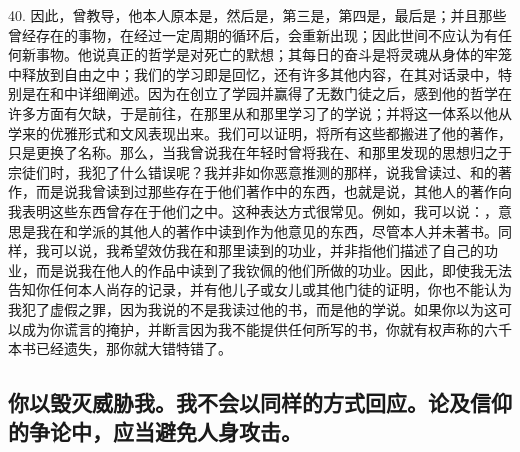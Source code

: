 \par

40. 因此，曾教导，他本人原本是，然后是，第三是，第四是，最后是；并且那些曾经存在的事物，在经过一定周期的循环后，会重新出现；因此世间不应认为有任何新事物。他说真正的哲学是对死亡的默想；其每日的奋斗是将灵魂从身体的牢笼中释放到自由之中；我们的学习即是回忆，还有许多其他内容，在其对话录中，特别是在和中详细阐述。因为在创立了学园并赢得了无数门徒之后，感到他的哲学在许多方面有欠缺，于是前往，在那里从和那里学习了的学说；并将这一体系以他从学来的优雅形式和文风表现出来。我们可以证明，将所有这些都搬进了他的著作，只是更换了名称。那么，当我曾说我在年轻时曾将我在、和那里发现的思想归之于宗徒们时，我犯了什么错误呢？我并非如你恶意推测的那样，说我曾读过、和的著作，而是说我曾读到过那些存在于他们著作中的东西，也就是说，其他人的著作向我表明这些东西曾存在于他们之中。这种表达方式很常见。例如，我可以说：，意思是我在和学派的其他人的著作中读到作为他意见的东西，尽管本人并未著书。同样，我可以说，我希望效仿我在和那里读到的功业，并非指他们描述了自己的功业，而是说我在他人的作品中读到了我钦佩的他们所做的功业。因此，即使我无法告知你任何本人尚存的记录，并有他儿子或女儿或其他门徒的证明，你也不能认为我犯了虚假之罪，因为我说的不是我读过他的书，而是他的学说。如果你以为这可以成为你谎言的掩护，并断言因为我不能提供任何所写的书，你就有权声称的六千本书已经遗失，那你就大错特错了。\par


\subsection{你以毁灭威胁我。我不会以同样的方式回应。论及信仰的争论中，应当避免人身攻击。}

